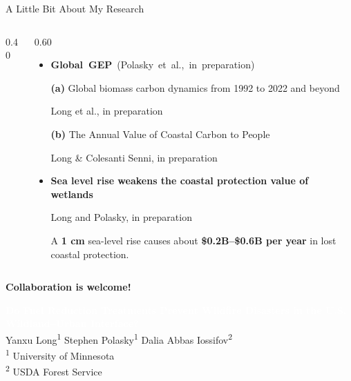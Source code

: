 \documentclass[10pt,aspectratio=169]{beamer}
\begin{document}
\begin{frame}{A Little Bit About My Research}
\begin{columns}[T,onlytextwidth]
\begin{column}{0.40\textwidth}
    \end{column}
    \begin{column}{0.60\textwidth}
      \raggedright
      \begin{itemize}
        \setlength{\itemsep}{0.85em}
        \item[\textcolor{darkgreen}{\scriptsize$\blacktriangleright$}] \mbox{{\small\bfseries Global GEP} {\scriptsize (Polasky et al., in preparation)}}\par\vspace{0.35em}
          {\footnotesize\textbf{(a)} Global biomass carbon dynamics from 1992 to 2022 and beyond}\par
          {\scriptsize Long et al., in preparation}\par\vspace{0.55em}
          {\footnotesize\textbf{(b)} The Annual Value of Coastal Carbon to People}\par
          {\scriptsize Long \& Colesanti Senni, in preparation}\par
        \item[\textcolor{darkgreen}{\scriptsize$\blacktriangleright$}] {\small\bfseries Sea level rise weakens the coastal protection value of wetlands}\par
          {\scriptsize Long and Polasky, in preparation}\par\vspace{0.3em}
          {\footnotesize A \textbf{1 cm} sea-level rise causes about \textbf{\$0.2B--\$0.6B per year} in lost coastal protection.}
      \end{itemize}
    \end{column}
  \end{columns}
  \vfill
  \begin{center}
    {\large\bfseries\color{darkgreen} Collaboration is welcome!}
  \end{center}
\end{frame}


{
\begin{frame}[plain]
  \centering
  \color{white}
  \vspace{1.3cm}
  {\Large \textcolor{white}{\textbf{Do Fuel Reduction Treatments Prevent Wildfire Disasters in the U.S. Wildland--Urban Interface?}}} \\[0.9em]
  \vspace{1.6em}
  {\normalsize Yanxu Long\textsuperscript{1} \quad Stephen Polasky\textsuperscript{1} \quad Dalia Abbas Iossifov\textsuperscript{2}} \\[0.7em]
  {\scriptsize \textsuperscript{1} University of Minnesota} \\[0.2em]
  {\scriptsize \textsuperscript{2} USDA Forest Service}
  \vfill
\end{frame}
}
\end{document}
